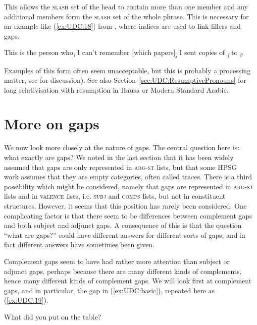 \documentclass[output=paper
	        ,collection
	        ,collectionchapter
 	        ,biblatex
                ,babelshorthands
                ,newtxmath
                ,draftmode
                ,colorlinks, citecolor=brown
]{langscibook}
\begin{document}
{\noindent
This allows the \textsc{slash} set of the head to contain more than one member
and any additional members form the \textsc{slash} set of the whole phrase. This
is necessary for an example like (\ref{ex:UDC:18}) from \citet{Chaves:12}, where indices
are used to link fillers and gaps.

\begin{exe}
\ex \label{ex:UDC:18}
 This is the person who\emph{\textsubscript{i}} I can't remember
{[}which papers{]}\emph{\textsubscript{j}} I sent copies of \trace{}
\emph{\textsubscript{j}} to \trace{}\emph{\textsubscript{i}}.
\end{exe}

\noindent
Examples of this form often seem unacceptable, but this is probably a
processing matter, see \citet[Section~3]{Chaves:12} for discussion).
See also Section~\ref{sec:UDC:ResumptivePronouns} for long
relativisation with resumption in Hausa or Modern Standard Arabic.

\section{More on gaps}
\label{sec:UDC:MoreOnGaps}


We now look more closely at the nature of gaps. The central question
here is: what exactly are gaps? We noted in the last section that it
has been widely assumed that gaps are only represented in
\textsc{arg-st} lists, but that some HPSG work assumes that they are
empty categories, often called traces. There is a third possibility
which might be considered, namely that gaps are represented in
\textsc{arg-st} lists and in \textsc{valence} lists,
i.e. \textsc{subj} and \textsc{comps} lists, but not in constituent
structures. However, it seems that this position has rarely been
considered. One complicating factor is that there seem to be
differences between complement gaps and both subject and adjunct
gaps. A consequence of this is that the question ``what are gaps?''
could have different answers for different sorts of gaps, and in fact
different answers have sometimes been given.

Complement gaps seem to have had rather more attention than subject or
adjunct gaps, perhaps because there are many different kinds of
complements, hence many different kinds of complement gaps. We will look
first at complement gaps, and in particular, the gap in (\ref{ex:UDC:basic}), repeated
here as (\ref{ex:UDC:19}).

\begin{exe}
\ex \label{ex:UDC:19}
What did you put \trace{} on the table?
\end{exe}

}
\end{document}

